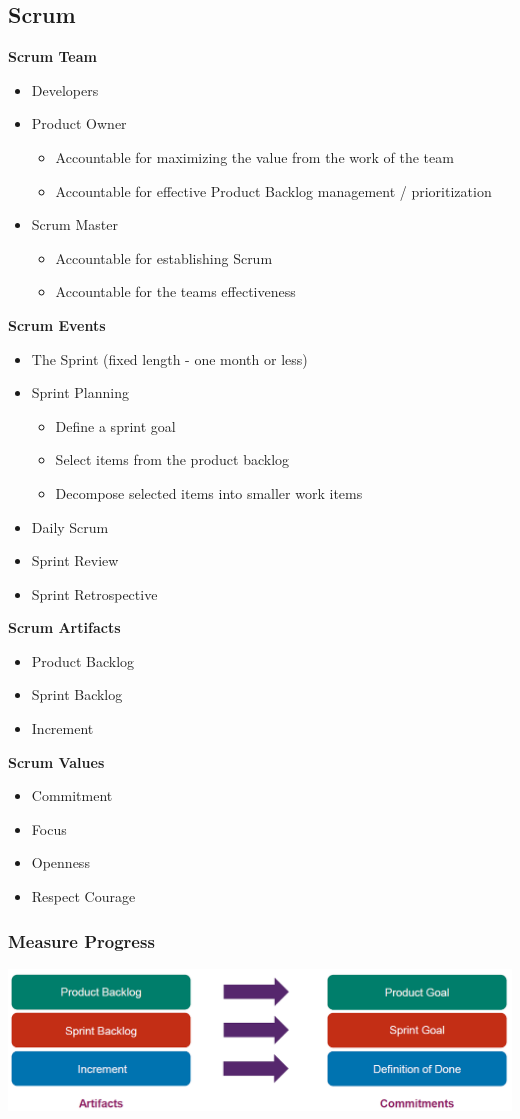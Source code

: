 \subsection{Scrum}
\textbf{Scrum Team}
\begin{itemize}
    \item Developers
    \item Product Owner
    \begin{itemize}
        \item Accountable for maximizing the value from the work of the team
        \item Accountable for effective Product Backlog management / prioritization
    \end{itemize}
    \item Scrum Master
    \begin{itemize}
        \item Accountable for establishing Scrum
        \item Accountable for the teams effectiveness
    \end{itemize}
\end{itemize}
\textbf{Scrum Events}
\begin{itemize}
    \item The Sprint (fixed length - one month or less)
    \item Sprint Planning
    \begin{itemize}
        \item Define a sprint goal
        \item Select items from the product backlog
        \item Decompose selected items into smaller work items
    \end{itemize}
    \item Daily Scrum
    \item Sprint Review
    \item Sprint Retrospective
\end{itemize}
\textbf{Scrum Artifacts}
\begin{itemize}
    \item Product Backlog
    \item Sprint Backlog
    \item Increment
\end{itemize}
\textbf{Scrum Values}
\begin{itemize}
    \item Commitment
    \item Focus
    \item Openness
    \item Respect Courage
\end{itemize}

\subsubsection{Measure Progress}
\includegraphics[width=\linewidth]{../img/scrum_progress.png}